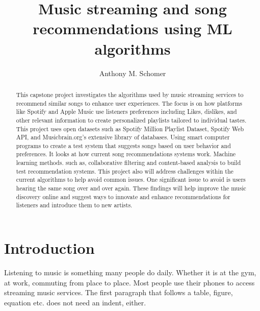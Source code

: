 \documentclass[runningheads]{llncs}
\begin{document}
%
\title{Music streaming and song recommendations using ML algorithms}
%
%
\author{Anthony M. Schomer}
%
%
%
\maketitle              %
%
\begin{abstract}
This capstone project investigates the algorithms used by music streaming services to recommend similar songs to enhance user experiences. The focus is on how platforms like Spotify and Apple Music use listeners preferences including Likes, dislikes, and other relevant information to create personalized playlists tailored to individual tastes. This project uses open datasets such as Spotify Million Playlist Dataset, Spotify Web API, and Musicbrain.org's extensive library of databases. Using smart computer programs to create a test system that suggests songs based on user behavior and preferences. It looks at how current song recommendations systems work. Machine learning methods. such as, collaborative filtering and content-based analysis to build test recommendation systems. This project also will address challenges within the current algorithms to help avoid common issues. One significant issue to avoid is users hearing the same song over and over again. These findings will help improve the music discovery online and suggest ways to innovate and enhance recommendations for listeners and introduce them to new artists. 

\end{abstract}
%
%
%
\section{Introduction}

Listening to music is something many people do daily. Whether it is at the gym, at work, commuting from place to place. Most people use their phones to access streaming music services.   The first paragraph that follows a table, figure,
equation etc. does not need an indent, either.
\end{document}
